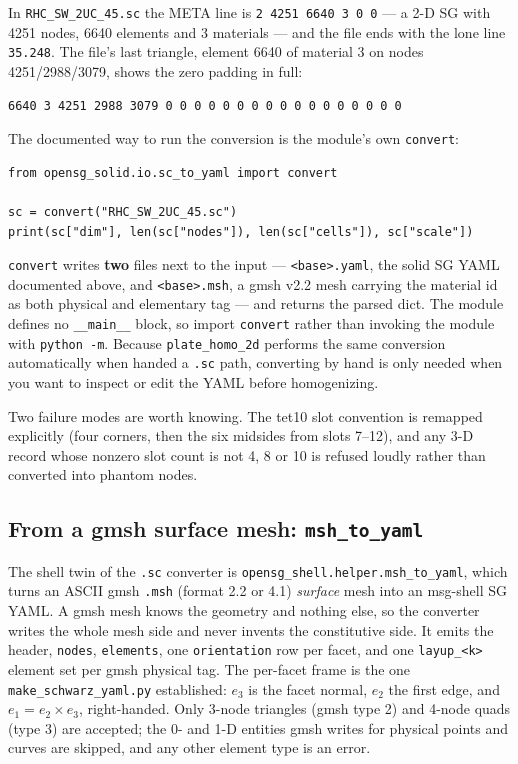 In \texttt{RHC\_SW\_2UC\_45.sc} the META line is \texttt{2 4251 6640 3 0 0} --- a
2-D SG with 4251 nodes, 6640 elements and 3 materials --- and the file ends with
the lone line \texttt{35.248}. The file's last triangle, element 6640 of material
3 on nodes 4251/2988/3079, shows the zero padding in full:

\begin{lstlisting}[style=shellst]
6640 3 4251 2988 3079 0 0 0 0 0 0 0 0 0 0 0 0 0 0 0 0 0
\end{lstlisting}

The documented way to run the conversion is the module's own \texttt{convert}:

\begin{lstlisting}[style=opensg,caption={Converting a .sc by hand.}]
from opensg_solid.io.sc_to_yaml import convert

sc = convert("RHC_SW_2UC_45.sc")
print(sc["dim"], len(sc["nodes"]), len(sc["cells"]), sc["scale"])
\end{lstlisting}

\texttt{convert} writes \textbf{two} files next to the input ---
\texttt{<base>.yaml}, the solid SG YAML documented above, and
\texttt{<base>.msh}, a gmsh v2.2 mesh carrying the material id as both physical
and elementary tag --- and returns the parsed dict. The module defines no
\texttt{\_\_main\_\_} block, so import \texttt{convert} rather than invoking the
module with \texttt{python -m}. Because \texttt{plate\_homo\_2d} performs the
same conversion automatically when handed a \texttt{.sc} path, converting by hand
is only needed when you want to inspect or edit the YAML before homogenizing.

Two failure modes are worth knowing. The tet10 slot convention is remapped
explicitly (four corners, then the six midsides from slots 7--12), and any 3-D
record whose nonzero slot count is not 4, 8 or 10 is refused loudly rather than
converted into phantom nodes.

\subsection{From a gmsh surface mesh: \texttt{msh\_to\_yaml}}
\label{sec:input-mshconv}

The shell twin of the \texttt{.sc} converter is
\texttt{opensg\_shell.helper.msh\_to\_yaml}, which turns an ASCII gmsh
\texttt{.msh} (format 2.2 or 4.1) \emph{surface} mesh into an msg-shell SG
YAML. A gmsh mesh knows the geometry and nothing else, so the converter writes
the whole mesh side and never invents the constitutive side. It emits the
header, \texttt{nodes}, \texttt{elements}, one \texttt{orientation}
row per facet, and one \texttt{layup\_<k>} element set per gmsh physical tag.
The per-facet frame is the one \texttt{make\_schwarz\_yaml.py} established:
$e_3$ is the facet normal, $e_2$ the first edge, and $e_1 = e_2 \times e_3$,
right-handed. Only 3-node triangles (gmsh type 2) and 4-node quads (type 3)
are accepted; the 0- and 1-D entities gmsh writes for physical points and
curves are skipped, and any other element type is an error.

